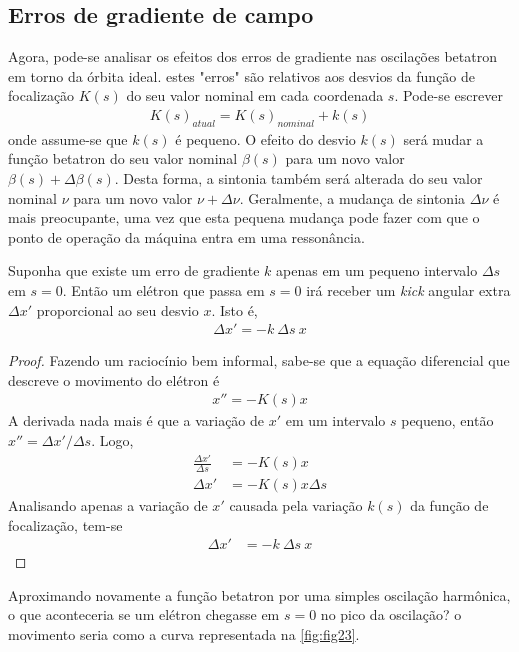 \subsection{Erros de gradiente de campo}
Agora, pode-se analisar os efeitos dos erros de gradiente nas oscilações betatron em torno da órbita ideal. estes "erros" são relativos aos desvios da função de focalização $K(s)$ do seu valor nominal em cada coordenada $s$. Pode-se escrever
\begin{align*}
	K(s)_{atual} = K(s)_{nominal} + k(s)
\end{align*}
onde assume-se que $k(s)$ é pequeno. O efeito do desvio $k(s)$ será mudar a função betatron do seu valor nominal $\beta(s)$ para um novo valor $\beta(s)+\Delta \beta(s)$. Desta forma, a sintonia também será alterada do seu valor nominal $\nu$ para um novo valor $\nu + \Delta \nu$. Geralmente, a mudança de sintonia $\Delta \nu$ é mais preocupante, uma vez que esta pequena mudança pode fazer com que o ponto de operação da máquina entra em uma ressonância.

Suponha que existe um erro de gradiente $k$ apenas em um pequeno intervalo $\Delta s$ em $s=0$. Então um elétron que passa em $s=0$ irá receber um \textit{kick} angular extra $\Delta x'$ proporcional ao seu desvio $x$. Isto é,
\begin{align}
	\Delta x' = -k\ \Delta s\ x\label{eq:2.96}
\end{align}

\begin{proof}
	Fazendo um raciocínio bem informal, sabe-se que a equação diferencial que descreve o movimento do elétron é
	\begin{align*}
		x'' = -K(s)x
	\end{align*}
	A derivada nada mais é que a variação de $x'$ em um intervalo $s$ pequeno, então $x'' = \Delta x'/\Delta s$. Logo,
	\begin{align*}
		\frac{\Delta x'}{\Delta s} &= -K(s)x\\
		\Delta x' &= -K(s)x \Delta s
	\end{align*}
	Analisando apenas a variação de $x'$ causada pela variação $k(s)$ da função de focalização, tem-se
	\begin{align*}
		\Delta x' &= -k\ \Delta s\ x
	\end{align*}
\end{proof}

Aproximando novamente a função betatron por uma simples oscilação harmônica, o que aconteceria se um elétron chegasse em $s=0$ no pico da oscilação? o movimento seria como a curva representada na \autoref{fig:fig23}.

